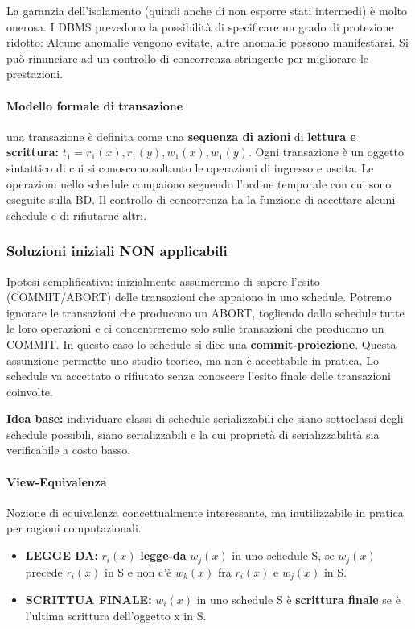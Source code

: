 \documentclass{article}
\begin{document}
La garanzia dell’isolamento (quindi anche di non esporre stati intermedi) è molto onerosa. I DBMS prevedono la possibilità di specificare un grado di protezione ridotto: Alcune anomalie vengono evitate, altre anomalie possono manifestarsi. Si può rinunciare ad un controllo di concorrenza stringente per migliorare le prestazioni.

\paragraph{Modello formale di transazione} una transazione è definita come una \textbf{sequenza di azioni} di \textbf{lettura e scrittura:} $t_1 = r_1(x),r_1(y),w_1(x),w_1(y)$. Ogni transazione è un oggetto sintattico di cui si conoscono soltanto le operazioni di ingresso e uscita. Le operazioni nello schedule compaiono seguendo
l’ordine temporale con cui sono eseguite sulla BD. Il controllo di concorrenza ha la funzione di accettare alcuni schedule e di rifiutarne altri.

\subsubsection{Soluzioni iniziali NON applicabili}
Ipotesi semplificativa: inizialmente assumeremo di sapere l’esito (COMMIT/ABORT) delle
transazioni che appaiono in uno schedule. Potremo ignorare le transazioni che producono un ABORT, togliendo dallo schedule tutte le loro operazioni e ci concentreremo solo sulle transazioni che producono un COMMIT. In questo caso lo schedule si dice una
\textbf{commit-proiezione}. Questa assunzione permette uno studio teorico, ma non è accettabile in pratica. Lo schedule va accettato o rifiutato senza conoscere l’esito finale delle transazioni coinvolte.

\textbf{Idea base:} individuare classi di schedule serializzabili che siano sottoclassi
degli schedule possibili, siano serializzabili e la cui proprietà di serializzabilità sia verificabile a costo basso.

\paragraph{View-Equivalenza}Nozione di equivalenza concettualmente interessante,
ma inutilizzabile in pratica per ragioni computazionali. \begin{itemize}
	\item \textbf{LEGGE DA:} $r_i(x)$ \textbf{legge-da} $w_j(x)$ in uno schedule S, se $w_j(x)$ precede $r_i(x)$ in S e non c'è $w_k(x)$ fra $r_i(x)$ e $w_j(x)$ in S.
	\item \textbf{SCRITTUA FINALE:} $w_i(x)$ in uno schedule S è \textbf{scrittura finale} se è l'ultima scrittura dell'oggetto x in S.
\end{itemize}
\end{document}

